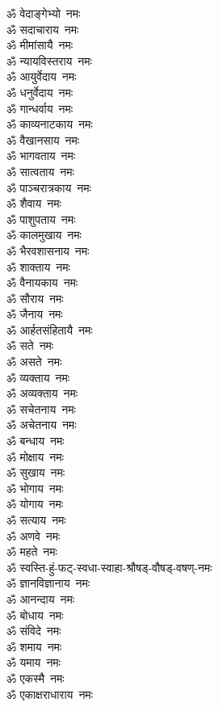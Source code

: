 \begin{multicols}{2}
\begin{flushleft}
ॐ वेदाङ्गेभ्यो~नमः\\
ॐ सदाचाराय~नमः\\
ॐ मीमांसायै~नमः\\
ॐ न्यायविस्तराय~नमः\\
ॐ आयुर्वेदाय~नमः\\
ॐ धनुर्वेदाय~नमः\\
ॐ गान्धर्वाय~नमः\\
ॐ काव्यनाटकाय~नमः\\
ॐ वैखानसाय~नमः\hfill{}\\
ॐ भागवताय~नमः\\
ॐ सात्वताय~नमः\\
ॐ पाञ्चरात्रकाय~नमः\\
ॐ शैवाय~नमः\\
ॐ पाशुपताय~नमः\\
ॐ कालमुखाय~नमः\\
ॐ भैरवशासनाय~नमः\\
ॐ शाक्ताय~नमः\\
ॐ वैनायकाय~नमः\\
ॐ सौराय~नमः\hfill{}\\
ॐ जैनाय~नमः\\
ॐ आर्हतसंहितायै~नमः\\
ॐ सते~नमः\\
ॐ असते~नमः\\
ॐ व्यक्ताय~नमः\\
ॐ अव्यक्ताय~नमः\\
ॐ सचेतनाय~नमः\\
ॐ अचेतनाय~नमः\\
ॐ बन्धाय~नमः\\
ॐ मोक्षाय~नमः\hfill{}\\
ॐ सुखाय~नमः\\
ॐ भोगाय~नमः\\
ॐ योगाय~नमः\\
ॐ सत्याय~नमः\\
ॐ अणवे~नमः\\
ॐ महते~नमः\\
ॐ स्वस्ति-हुं-फट्-स्वधा-स्वाहा-श्रौषड्-वौषड्-वषण्-नमः\\
ॐ ज्ञानविज्ञानाय~नमः\\
ॐ आनन्दाय~नमः\\
ॐ बोधाय~नमः\hfill{}\\
ॐ संविदे~नमः\\
ॐ शमाय~नमः\\
ॐ यमाय~नमः\\
ॐ एकस्मै~नमः\\
ॐ एकाक्षराधाराय~नमः\\

\end{flushleft}
\end{multicols}
